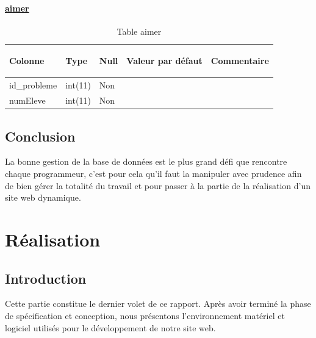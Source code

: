 \documentclass[11.5pt]{report}
\begin{document}
\subsubsection{\underline{aimer}}
\begin{table}[h]
	\begin{center}
	\begin{tabular}{|l|l|l|l|l|}
		\hline
		\begin{bf}Colonne\end{bf} & \begin{bf}Type\end{bf} & \begin{bf}Null\end{bf} & \begin{bf}Valeur par défaut\end{bf} & \begin{bf}Commentaire\end{bf}  \\
		\hline
		id\_probleme & int(11) & Non & & \\
		\hline
		numEleve & int(11) & Non & & \\
		\hline
		
		
	\end{tabular}
	\caption{Table aimer}
\end{center}
\end{table}
\section{Conclusion }
La bonne gestion de la base de données est le plus grand défi que rencontre chaque programmeur, c’est pour cela qu’il faut la manipuler avec prudence afin de bien gérer la totalité du travail et pour passer à la partie de la réalisation d’un site web dynamique.
\chapter{Réalisation}
\newpage
\section{Introduction}
Cette partie constitue le dernier volet de ce rapport. Après avoir terminé la phase de spécification et conception, nous présentons l’environnement matériel et logiciel utilisés pour le développement de notre site web.\\
\end{document}
